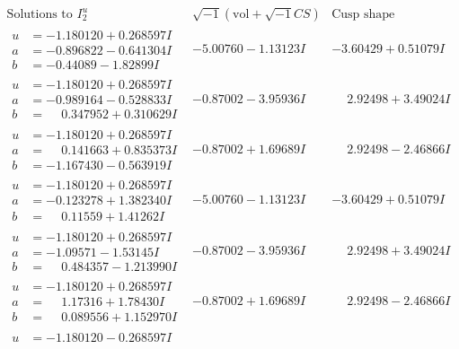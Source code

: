 \documentclass[1p]{elsarticle_modified}
\theoremstyle{definition}
\newcommand{\I}{\sqrt{-1}}
\begin{document}
$$\begin{array}{c|c|c}  
\text{Solutions to }I^u_{2}& \I (\text{vol} + \sqrt{-1}CS) & \text{Cusp shape}\\
 \hline 
\begin{aligned}
u &= -1.180120 + 0.268597 I \\
a &= -0.896822 - 0.641304 I \\
b &= -0.44089 - 1.82899 I\end{aligned}
 & -5.00760 - 1.13123 I & -3.60429 + 0.51079 I \\ \hline\begin{aligned}
u &= -1.180120 + 0.268597 I \\
a &= -0.989164 - 0.528833 I \\
b &= \phantom{-}0.347952 + 0.310629 I\end{aligned}
 & -0.87002 - 3.95936 I & \phantom{-}2.92498 + 3.49024 I \\ \hline\begin{aligned}
u &= -1.180120 + 0.268597 I \\
a &= \phantom{-}0.141663 + 0.835373 I \\
b &= -1.167430 - 0.563919 I\end{aligned}
 & -0.87002 + 1.69689 I & \phantom{-}2.92498 - 2.46866 I \\ \hline\begin{aligned}
u &= -1.180120 + 0.268597 I \\
a &= -0.123278 + 1.382340 I \\
b &= \phantom{-}0.11559 + 1.41262 I\end{aligned}
 & -5.00760 - 1.13123 I & -3.60429 + 0.51079 I \\ \hline\begin{aligned}
u &= -1.180120 + 0.268597 I \\
a &= -1.09571 - 1.53145 I \\
b &= \phantom{-}0.484357 - 1.213990 I\end{aligned}
 & -0.87002 - 3.95936 I & \phantom{-}2.92498 + 3.49024 I \\ \hline\begin{aligned}
u &= -1.180120 + 0.268597 I \\
a &= \phantom{-}1.17316 + 1.78430 I \\
b &= \phantom{-}0.089556 + 1.152970 I\end{aligned}
 & -0.87002 + 1.69689 I & \phantom{-}2.92498 - 2.46866 I \\ \hline\begin{aligned}
u &= -1.180120 - 0.268597 I \\

\end{aligned}
\end{array}$$
\end{document}
